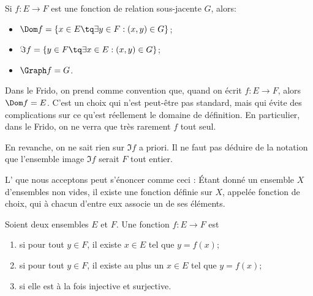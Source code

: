 \begin{remark}\label{RemLienFctRelation}
	Si \( f: E \to F \) est une fonction de relation sous-jacente \( G \), alors:
	\begin{itemize}
		\item \( \Dom f = \{ x \in E \tq \exists y \in F: (x, y) \in G\} \);
		\item \( \Im f = \{ y \in F \tq \exists x \in E: (x, y) \in G\} \);
		\item \( \Graph f = G \).
	\end{itemize}
\end{remark}

\begin{remark}	\label{REMooFonctionDomaineEntier}
	Dans le Frido, on prend comme convention que, quand on écrit \( f: E \to F \), alors \( \Dom f = E \). C'est un choix qui n'est peut-être pas standard, mais qui évite des complications sur ce qu'est réellement le domaine de définition. En particulier, dans le Frido, on ne verra que très rarement \( f \) \og tout seul\fg.

	En revanche, on ne sait rien sur \( \Im f \) a priori. Il ne faut pas déduire de la notation que l'ensemble image \( \Im f \) serait \( F \) tout entier.
\end{remark}

\begin{normaltext}\label{NORooLMBYooYjUoju}
	L' que nous acceptons peut s'énoncer comme ceci\cite{ooKLIXooHbpufL} : Étant donné un ensemble \( X\) d'ensembles non vides, il existe une fonction définie sur \( X\), appelée fonction de choix, qui à chacun d'entre eux associe un de ses éléments.
\end{normaltext}

\begin{definition}\label{DefooInjSurjBij}
	Soient deux ensembles \( E\) et \( F\). Une fonction \( f\colon E\to F\) est
	\begin{enumerate}
		\item
		       si pour tout \( y\in F\), il existe \( x\in E\) tel que \( y=f(x)\);
		\item
		       si pour tout \( y\in F\), il existe au plus un \(x\in E \) tel que \( y=f(x)\);
		\item
		       si elle est à la fois injective et surjective.
	\end{enumerate}
\end{definition}


